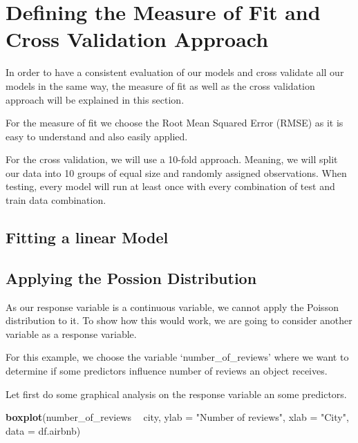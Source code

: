 \documentclass[
]{article}
\newenvironment{Shaded}{\begin{snugshade}}{\end{snugshade}}
\newcommand{\DataTypeTok}[1]{\textcolor[rgb]{0.13,0.29,0.53}{#1}}
\newcommand{\KeywordTok}[1]{\textcolor[rgb]{0.13,0.29,0.53}{\textbf{#1}}}
\newcommand{\NormalTok}[1]{#1}
\newcommand{\OperatorTok}[1]{\textcolor[rgb]{0.81,0.36,0.00}{\textbf{#1}}}
\newcommand{\StringTok}[1]{\textcolor[rgb]{0.31,0.60,0.02}{#1}}
\begin{document}
\hypertarget{defining-the-measure-of-fit-and-cross-validation-approach}{%
\section{Defining the Measure of Fit and Cross Validation
Approach}\label{defining-the-measure-of-fit-and-cross-validation-approach}}

In order to have a consistent evaluation of our models and cross
validate all our models in the same way, the measure of fit as well as
the cross validation approach will be explained in this section.

For the measure of fit we choose the Root Mean Squared Error (RMSE) as
it is easy to understand and also easily applied.

For the cross validation, we will use a 10-fold approach. Meaning, we
will split our data into 10 groups of equal size and randomly assigned
observations. When testing, every model will run at least once with
every combination of test and train data combination.

\hypertarget{fitting-a-linear-model}{%
\subsection{Fitting a linear Model}\label{fitting-a-linear-model}}

\hypertarget{applying-the-possion-distribution}{%
\subsection{Applying the Possion
Distribution}\label{applying-the-possion-distribution}}

As our response variable is a continuous variable, we cannot apply the
Poisson distribution to it. To show how this would work, we are going to
consider another variable as a response variable.

For this example, we choose the variable `number\_of\_reviews' where we
want to determine if some predictors influence number of reviews an
object receives.

Let first do some graphical analysis on the response variable an some
predictors.

\begin{Shaded}
\begin{Highlighting}[]
\KeywordTok{boxplot}\NormalTok{(number_of_reviews }\OperatorTok{~}\StringTok{ }\NormalTok{city,}
        \DataTypeTok{ylab =} \StringTok{"Number of reviews"}\NormalTok{,}
        \DataTypeTok{xlab =} \StringTok{"City"}\NormalTok{,}
        \DataTypeTok{data =}\NormalTok{ df.airbnb)}
\end{Highlighting}
\end{Shaded}
\end{document}
